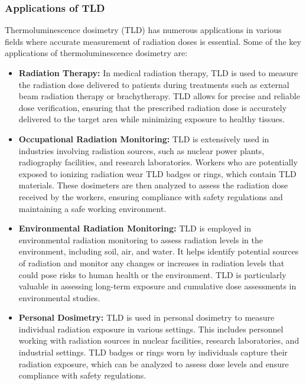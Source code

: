 \documentclass[../introduction.tex]{subfiles}
\begin{document}
    \subsubsection*{\large Applications of TLD}
        Thermoluminescence dosimetry (TLD) has numerous applications in various fields where accurate measurement of 
        radiation doses is essential. Some of the key applications of thermoluminescence dosimetry are:

        \begin{itemize}
            \item \textbf{Radiation Therapy: } In medical radiation therapy, TLD is used to measure the radiation dose 
            delivered to patients during treatments such as external beam radiation therapy or brachytherapy. 
            TLD allows for precise and reliable dose verification, ensuring that the prescribed radiation dose is 
            accurately delivered to the target area while minimizing exposure to healthy tissues.

            \item \textbf{Occupational Radiation Monitoring: } TLD is extensively used in industries involving radiation 
            sources, such as nuclear power plants, radiography facilities, and research laboratories. Workers who are 
            potentially exposed to ionizing radiation wear TLD badges or rings, which contain TLD materials. These 
            dosimeters are then analyzed to assess the radiation dose received by the workers, ensuring compliance with 
            safety regulations and maintaining a safe working environment.

            \item \textbf{Environmental Radiation Monitoring: } TLD is employed in environmental radiation monitoring 
            to assess radiation levels in the environment, including soil, air, and water. It helps identify potential 
            sources of radiation and monitor any changes or increases in radiation levels that could pose risks to human 
            health or the environment. TLD is particularly valuable in assessing long-term exposure and cumulative dose 
            assessments in environmental studies.

            \item \textbf{Personal Dosimetry: } TLD is used in personal dosimetry to measure individual radiation 
            exposure in various settings. This includes personnel working with radiation sources in nuclear facilities, 
            research laboratories, and industrial settings. TLD badges or rings worn by individuals capture their 
            radiation exposure, which can be analyzed to assess dose levels and ensure compliance with safety 
            regulations.


\end{itemize}
\end{document}
